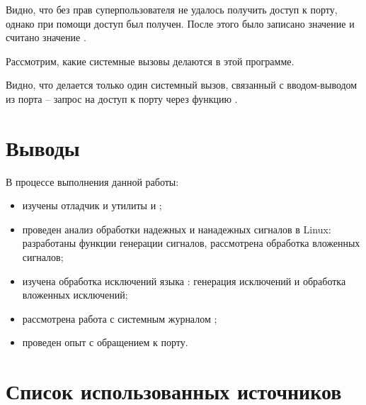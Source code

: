 
Видно, что без прав суперпользователя не удалось получить доступ к порту, однако при помощи  доступ был получен. После этого было записано значение  и считано значение . 

Рассмотрим, какие системные вызовы делаются в этой программе.


Видно, что делается только один системный вызов, связанный с вводом-выводом из порта -- запрос на доступ к порту через функцию . 

\section{Выводы}

В процессе выполнения данной работы:

\begin{itemize}
	\item изучены отладчик  и утилиты  и ;
	\item проведен анализ обработки надежных и нанадежных сигналов в Linux: разработаны функции генерации сигналов, рассмотрена обработка вложенных сигналов;
	\item изучена обработка исключений языка : генерация исключений и обработка вложенных исключений;
	\item рассмотрена работа с системным журналом ;
	\item проведен опыт с обращением к порту.
\end{itemize}

\newpage

\section*{Список использованных источников}

